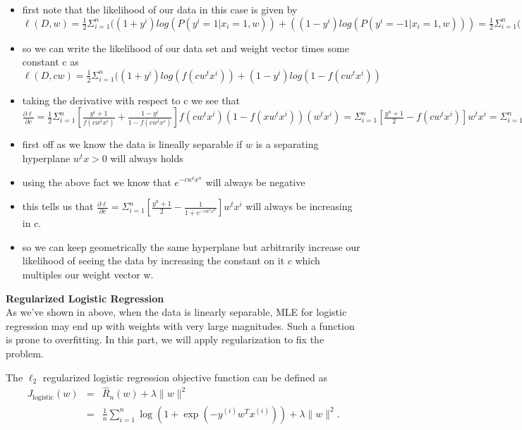 \documentclass{article}
\newcommand{\nyuparagraph}[1]{\vspace{0.3cm}\textcolor{nyupurple}{\bf \large #1}\\}
\theoremstyle{plain}
\theoremstyle{definition}
\begin{document}
\begin{enumerate}
\begin{itemize}
    \color{blue}
    \item first note that the likelihood of our data in this case is given by $\ell(D,w)=\frac{1}{2}\Sigma_{i=1}^{n}( (1+y^i)log(P(y^i=1|x_i=1,w)) +((1-y^i)log(P(y^i=-1|x_i=1,w)))=\frac{1}{2}\Sigma_{i=1}^{n}((1+y^i)log(f(w^tx^i))+(1-y^i)log(1-f(w^tx^i))$
    \item so we can write the likelihood of our data set and weight vector times some constant c as $\ell(D,cw)=\frac{1}{2}\Sigma_{i=1}^{n}((1+y^i)log(f(cw^tx^i))+(1-y^i)log(1-f(cw^tx^i))$
    \item taking the derivative with respect to c we see that $\frac{\partial \ell}{\partial c}=\frac{1}{2}\Sigma_{i=1}^{n}[\frac{y^i+1}{f(cw^tx^i)} +\frac{1-y^i}{1-f(cw^tx^i)}]f(cw^tx^i)(1-f(xw^tx^i))(w^tx^i)=\Sigma_{i=1}^{n}[\frac{y^n+1}{2}-f(cw^tx^i)]w^tx^i=\Sigma_{i=1}^{n}[\frac{y^n+1}{2}-\frac{1}{1+e^{-cw^tx^n}}]w^tx^i$
    \item first off as we know the data is lineally separable if $w$ is a separating hyperplane $w^tx>0$ will always holds 
    \item using the above fact we know that $e^{-cw^tx^n}$ will always be negative 
    \item this tells us that  $\frac{\partial \ell}{\partial c}=\Sigma_{i=1}^{n}[\frac{y^n+1}{2}-\frac{1}{1+e^{-cw^tx^n}}]w^tx^i$ will always be increasing in c. 
    \item so we can keep geometrically the same hyperplane but arbitrarily increase our likelihood of seeing the data by increasing the constant on it $c$ which multiples our weight vector w.  
\end{itemize}


\setcounter{saveenum}{\value{enumi}}
\end{enumerate}

\nyuparagraph{\label{subsec:Regularized-Logistic-Regression}Regularized Logistic
Regression}
As we've shown in above, when the data is linearly separable,
MLE for logistic regression may end up with weights with very large magnitudes. Such a function is prone to overfitting.
In this part, we will apply regularization to fix the problem.

The $\ell_2$ regularized
logistic regression objective function can be defined as
\begin{eqnarray*}
J_{\text{logistic}}(w) & = & \hat{R}_{n}(w)+\lambda\|w\|^{2}\\
 & = & \frac{1}{n}\sum_{i=1}^{n}\log\left(1+\exp\left(-y^{(i)}w^{T}x^{(i)}\right)\right)+\lambda\|w\|^{2}.
\end{eqnarray*}
 
\end{document}
